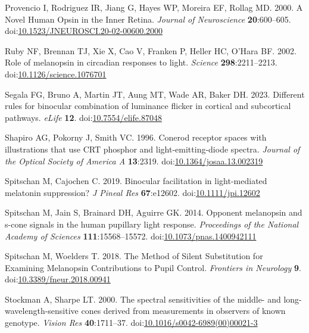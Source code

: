 \documentclass[
]{article}
\newlength{\cslhangindent}
\newlength{\cslentryspacingunit} %
\newenvironment{CSLReferences}[2] %
 {%
  \setlength{\parindent}{0pt}
  \ifodd #1
  \let\oldpar\par
  \def\par{\hangindent=\cslhangindent\oldpar}
  \fi
  \setlength{\parskip}{#2\cslentryspacingunit}
 }%
 {}
\begin{document}
\begin{CSLReferences}{1}{0}
\leavevmode{}%
Provencio I, Rodriguez IR, Jiang G, Hayes WP, Moreira EF, Rollag MD. 2000. A {Novel} {Human} {Opsin} in the {Inner} {Retina}. \emph{Journal of Neuroscience} \textbf{20}:600--605. doi:\href{https://doi.org/10.1523/JNEUROSCI.20-02-00600.2000}{10.1523/JNEUROSCI.20-02-00600.2000}

\leavevmode{}%
Ruby NF, Brennan TJ, Xie X, Cao V, Franken P, Heller HC, O'Hara BF. 2002. Role of melanopsin in circadian responses to light. \emph{Science} \textbf{298}:2211--2213. doi:\href{https://doi.org/10.1126/science.1076701}{10.1126/science.1076701}

\leavevmode{}%
Segala FG, Bruno A, Martin JT, Aung MT, Wade AR, Baker DH. 2023. Different rules for binocular combination of luminance flicker in cortical and subcortical pathways. \emph{eLife} \textbf{12}. doi:\href{https://doi.org/10.7554/elife.87048}{10.7554/elife.87048}

\leavevmode{}%
Shapiro AG, Pokorny J, Smith VC. 1996. Cone{\textendash}rod receptor spaces with illustrations that use {CRT} phosphor and light-emitting-diode spectra. \emph{Journal of the Optical Society of America A} \textbf{13}:2319. doi:\href{https://doi.org/10.1364/josaa.13.002319}{10.1364/josaa.13.002319}

\leavevmode{}%
Spitschan M, Cajochen C. 2019. Binocular facilitation in light-mediated melatonin suppression? \emph{J Pineal Res} \textbf{67}:e12602. doi:\href{https://doi.org/10.1111/jpi.12602}{10.1111/jpi.12602}

\leavevmode{}%
Spitschan M, Jain S, Brainard DH, Aguirre GK. 2014. Opponent melanopsin and s-cone signals in the human pupillary light response. \emph{Proceedings of the National Academy of Sciences} \textbf{111}:15568--15572. doi:\href{https://doi.org/10.1073/pnas.1400942111}{10.1073/pnas.1400942111}

\leavevmode{}%
Spitschan M, Woelders T. 2018. The {Method} of {Silent} {Substitution} for {Examining} {Melanopsin} {Contributions} to {Pupil} {Control}. \emph{Frontiers in Neurology} \textbf{9}. doi:\href{https://doi.org/10.3389/fneur.2018.00941}{10.3389/fneur.2018.00941}

\leavevmode{}%
Stockman A, Sharpe LT. 2000. The spectral sensitivities of the middle- and long-wavelength-sensitive cones derived from measurements in observers of known genotype. \emph{Vision Res} \textbf{40}:1711--37. doi:\href{https://doi.org/10.1016/s0042-6989(00)00021-3}{10.1016/s0042-6989(00)00021-3}


\end{CSLReferences}
\end{document}
